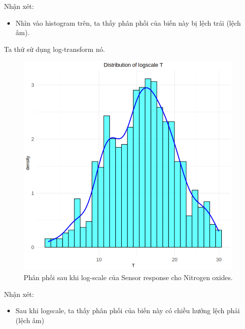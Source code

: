 Nhận xét:
\begin{itemize}
    \item Nhìn vào histogram trên, ta thấy phân phối của biến này bị lệch trái (lệch âm).
\end{itemize}

Ta thử sử dụng log-transform nó.

\begin{figure}[H]
    \centering
    \includegraphics[width=0.75\columnwidth]{air_figures/T_logscale_distribution.png}
    \caption{Phân phối sau khi log-scale của Sensor response cho Nitrogen oxides.}
    \label{fig:t_logscale_distribution}
\end{figure}
Nhận xét:
\begin{itemize}
    \item Sau khi logscale, ta thấy phân phối của biến này có chiều hướng lệch phải (lệch âm)
\end{itemize}

